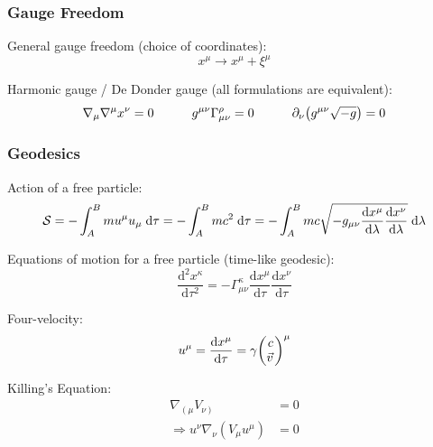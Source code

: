 		\subsubsection{Gauge Freedom}
			General gauge freedom (choice of coordinates):
			\begin{equation}
				x^\mu \rightarrow x^\mu + \xi^\mu
			\end{equation}

			\noindent
			Harmonic gauge / De Donder gauge (all formulations are equivalent):
			\begin{equation}
				\nabla_\mu \nabla^\mu x^\nu = 0
				\hspace{30pt} g^{\mu\nu} \Gamma^\rho_{\mu\nu} = 0
				\hspace{30pt} \partial_\nu \qty(g^{\mu\nu}\sqrt{-g}) = 0
			\end{equation}

		\subsubsection{Geodesics}
			\noindent
			Action of a free particle:
			\begin{equation}
				\mathcal{S}
				= -\int_A^B m u^\mu u_\mu \;\dd \tau
				= -\int_A^B mc^2\;\dd \tau
				= -\int_A^B mc\sqrt{-g_{\mu\nu} \dv{x^\mu}{\lambda} \dv{x^\nu}{\lambda}} \;\dd \lambda
			\end{equation}

			\noindent
			Equations of motion for a free particle (time-like geodesic):
			\begin{equation}
				\frac{\mathrm{d}^2 x^\kappa}{\mathrm{d}\tau^2}=-\Gamma_{\mu\nu}^{\kappa}\frac{\mathrm{d}x^\mu}{\mathrm{d}\tau}\frac{\mathrm{d}x^\nu}{\mathrm{d}\tau}
			\end{equation}

			\noindent
			Four-velocity:
			\begin{equation}
				u^\mu = \dv{x^\mu}{\tau} = \gamma \mqty(c \\ \vec{v})^\mu
			\end{equation}

			\noindent
			Killing's Equation:
			\begin{equation}
				\begin{aligned}
					\nabla_{\left(\mu\right.} V_{\left.\nu\right)} &= 0 \\
					\Rightarrow u^\nu \nabla_\nu (V_\mu u^\mu) &= 0
				\end{aligned}
			\end{equation}

